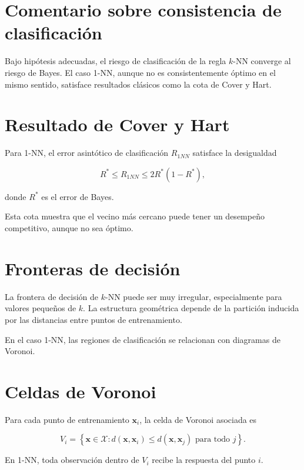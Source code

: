 \documentclass[
  spanish,
  11pt,
  letterpaper,
  DIV=11,
  numbers=noendperiod]{scrreprt}
\theoremstyle{definition}
\theoremstyle{plain}
\theoremstyle{definition}
\theoremstyle{remark}
\begin{document}
\section{Comentario sobre consistencia de
clasificación}\label{comentario-sobre-consistencia-de-clasificaciuxf3n}

Bajo hipótesis adecuadas, el riesgo de clasificación de la regla
\(k\)-NN converge al riesgo de Bayes. El caso 1-NN, aunque no es
consistentemente óptimo en el mismo sentido, satisface resultados
clásicos como la cota de Cover y Hart.

\section{Resultado de Cover y Hart}\label{resultado-de-cover-y-hart}

Para 1-NN, el error asintótico de clasificación \(R_{1NN}\) satisface la
desigualdad

\[
R^*\le R_{1NN}\le 2R^*(1-R^*),
\]

donde \(R^*\) es el error de Bayes.

Esta cota muestra que el vecino más cercano puede tener un desempeño
competitivo, aunque no sea óptimo.

\section{Fronteras de decisión}\label{fronteras-de-decisiuxf3n}

La frontera de decisión de \(k\)-NN puede ser muy irregular,
especialmente para valores pequeños de \(k\). La estructura geométrica
depende de la partición inducida por las distancias entre puntos de
entrenamiento.

En el caso 1-NN, las regiones de clasificación se relacionan con
diagramas de Voronoi.

\section{Celdas de Voronoi}\label{celdas-de-voronoi}

Para cada punto de entrenamiento \(\mathbf{x}_i\), la celda de Voronoi
asociada es

\[
V_i
=
\left\{
\mathbf{x}\in\mathcal{X}:
 d(\mathbf{x},\mathbf{x}_i)
 \le
 d(\mathbf{x},\mathbf{x}_j)
 \text{ para todo } j
\right\}.
\]

En 1-NN, toda observación dentro de \(V_i\) recibe la respuesta del
punto \(i\).
\end{document}
